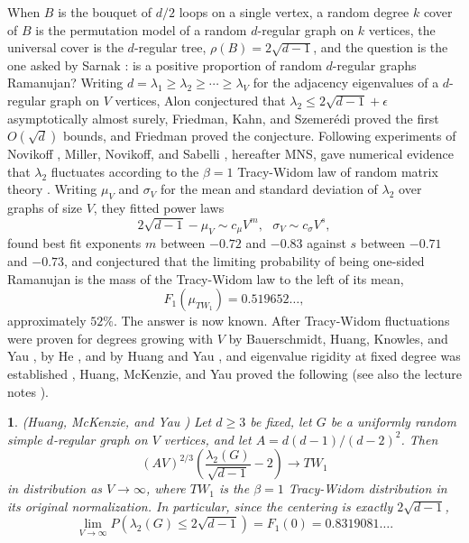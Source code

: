 \documentclass[12pt,oneside,english]{amsart}
\numberwithin{equation}{section}
\numberwithin{figure}{section}
\numberwithin{table}{section}
\theoremstyle{plain}
\newtheorem{thm}{\protect\theoremname}
\numberwithin{thm}{section}
\theoremstyle{plain}
\theoremstyle{plain}
\theoremstyle{plain}
\theoremstyle{definition}
\theoremstyle{definition}
\theoremstyle{definition}
\theoremstyle{remark}
\providecommand{\theoremname}{Theorem}
\begin{document}
When $B$ is the bouquet of $d/2$ loops on a single vertex, a random
degree $k$ cover of $B$ is the permutation model of a random $d$-regular
graph on $k$ vertices, the universal cover is the $d$-regular tree,
$\rho(B)=2\sqrt{d-1}$, and the question is the one asked by Sarnak
\cite{Sarnak2004}: is a positive proportion of random $d$-regular
graphs Ramanujan? Writing $d=\lambda_{1}\geq\lambda_{2}\geq\cdots\geq\lambda_{V}$
for the adjacency eigenvalues of a $d$-regular graph on $V$ vertices,
Alon \cite{Alon1986} conjectured that $\lambda_{2}\leq2\sqrt{d-1}+\epsilon$
asymptotically almost surely, Friedman, Kahn, and Szemer\'{e}di \cite{FriedmanKahnSzemeredi1989,Friedman1991}
proved the first $O(\sqrt{d})$ bounds, and Friedman \cite{Friedman2008}
proved the conjecture. Following experiments of Novikoff \cite{Novikoff2002}, Miller,
Novikoff, and Sabelli \cite{MillerNovikoffSabelli2008}, hereafter
MNS, gave numerical evidence that $\lambda_{2}$ fluctuates according
to the $\beta=1$ Tracy-Widom law of random matrix theory \cite{TracyWidom1996}.
Writing $\mu_{V}$ and $\sigma_{V}$ for the mean and standard deviation
of $\lambda_{2}$ over graphs of size $V$, they fitted power laws
\[
2\sqrt{d-1}-\mu_{V}\sim c_{\mu}V^{m},\ \ \ \sigma_{V}\sim c_{\sigma}V^{s},
\]
found best fit exponents $m$ between $-0.72$ and $-0.83$ against
$s$ between $-0.71$ and $-0.73$, and conjectured that the limiting
probability of being one-sided Ramanujan is the mass of the Tracy-Widom
law to the left of its mean,
\begin{equation}
F_{1}(\mu_{TW_{1}})=0.519652\dots,\label{eq:mns_52_percent}
\end{equation}
approximately $52\%$. The answer is now known. After Tracy-Widom fluctuations
were proven for degrees growing with $V$ by Bauerschmidt, Huang, Knowles,
and Yau \cite{BauerschmidtHuangKnowlesYau2020}, by He \cite{He2022},
and by Huang and Yau \cite{HuangYau2023}, and eigenvalue rigidity
at fixed degree was established \cite{HuangYau2024,HuangMcKenzieYau2024Rigidity},
Huang, McKenzie, and Yau \cite{HuangMcKenzieYau2024} proved the following
(see also the lecture notes \cite{HuangYau2026}).
\begin{thm}
\label{thm:hmy}(Huang, McKenzie, and Yau \cite{HuangMcKenzieYau2024})
Let $d\geq3$ be fixed, let $G$ be a uniformly random simple $d$-regular
graph on $V$ vertices, and let $A=d(d-1)/(d-2)^{2}$. Then
\[
(AV)^{2/3}\left(\frac{\lambda_{2}(G)}{\sqrt{d-1}}-2\right)\rightarrow TW_{1}
\]
in distribution as $V\rightarrow\infty$, where $TW_{1}$ is the $\beta=1$
Tracy-Widom distribution in its original normalization. In particular,
since the centering is exactly $2\sqrt{d-1}$,
\[
\lim_{V\rightarrow\infty}P\left(\lambda_{2}(G)\leq2\sqrt{d-1}\right)=F_{1}(0)=0.8319081\dots.
\]
\end{thm}
\end{document}
